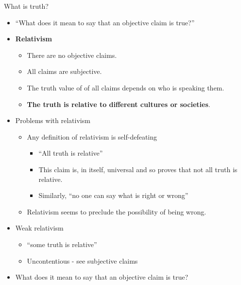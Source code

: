 \documentclass{beamer}
\begin{document}
\begin{frame}{What is truth?}
	\begin{itemize}
		\item ``What does it mean to say that an objective claim is true?''
		\item \textbf{Relativism}
		\begin{itemize}
			\item There are no objective claims.
			\item All claims are subjective.
			\item The truth value of of all claims depends on who is speaking them.
			\item \textbf{The truth is relative to different cultures or societies}.
		\end{itemize}
		\item Problems with relativism
		\begin{itemize}
			\item Any definition of relativism is self-defeating
			\begin{itemize}
				\item ``All truth is relative''
				\item This claim is, in itself, universal and so proves that not all truth is relative.
				\item Similarly, ``no one can say what is right or wrong''
			\end{itemize}
			\item Relativism seems to preclude the possibility of being wrong. 	
		\end{itemize}
		\item Weak relativism
		\begin{itemize}
			\item ``some truth is relative''
			\item Uncontentious - see subjective claims
		\end{itemize}
			\item What does it mean to say that an objective claim is true?
	\end{itemize}
\end{frame}
\end{document}
